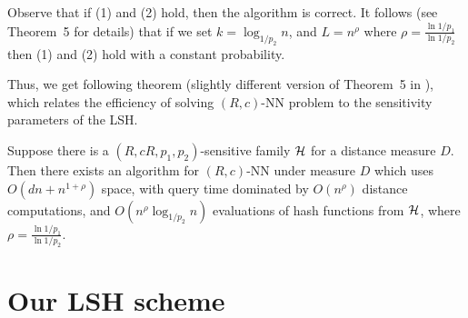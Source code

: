 \documentclass[12pt]{article}
\begin{document}
Observe that if (1) and (2) hold, then the algorithm is correct.
It follows (see \cite{IM} Theorem~5 for details) that if we set $k =
\log_{1/p_2} n$, and $L = n^\rho$ where $\rho=\frac{\ln 1/p_1}{\ln 1/p_2}$
then (1) and (2) hold with a constant probability.

Thus, we get following theorem (slightly different
version of Theorem~5 in \cite{IM}), which relates the efficiency of
solving $(R,c)$-NN problem to the sensitivity parameters of the LSH.
\begin{theorem}
\label{t:sens}
Suppose there is a $(R,c R,p_1,p_2)$-sensitive family ${\cal H}$ for a
distance measure $D$.
Then there exists an algorithm for $(R,c)$-NN under measure $D$
which uses  $O(d n +  n^{1+\rho})$ space, with query time dominated by
$O(n^{\rho})$ distance computations, and $O(n^{\rho} \log_{1/p_2} n)$ evaluations of
hash functions from ${\cal H}$,
where $\rho=\frac{\ln 1/p_1}{\ln 1/p_2}$.
\end{theorem}

\section{Our LSH scheme}
\end{document}

